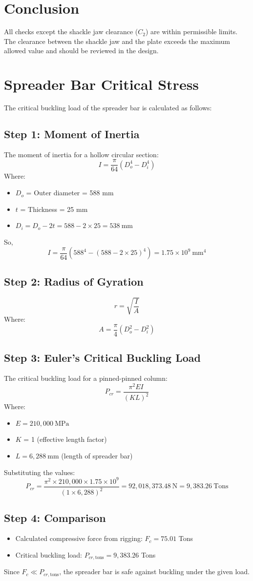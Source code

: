 \documentclass[12pt]{article}
\begin{document}
\section{Conclusion}
All checks except the shackle jaw clearance ($C_2$) are within permissible limits. The clearance between the shackle jaw and the plate exceeds the maximum allowed value and should be reviewed in the design.

\section{Spreader Bar Critical Stress}
The critical buckling load of the spreader bar is calculated as follows:

\subsection*{Step 1: Moment of Inertia}
The moment of inertia for a hollow circular section:
\[
I = \frac{\pi}{64} (D_o^4 - D_i^4)
\]
Where:
\begin{itemize}
  \item $D_o$ = Outer diameter = 588 mm
  \item $t$ = Thickness = 25 mm
  \item $D_i = D_o - 2t = 588 - 2 \times 25 = 538\ \mathrm{mm}$
\end{itemize}
So,
\[
I = \frac{\pi}{64} (588^4 - (588-2 \times 25)^4) = 1.75 \times 10^9\ \mathrm{mm}^4
\]

\subsection*{Step 2: Radius of Gyration}
\[
r = \sqrt{\frac{I}{A}}
\]
Where:
\[
A = \frac{\pi}{4} (D_o^2 - D_i^2)
\]

\subsection*{Step 3: Euler's Critical Buckling Load}
The critical buckling load for a pinned-pinned column:
\[
P_{cr} = \frac{\pi^2 E I}{(K L)^2}
\]
Where:
\begin{itemize}
  \item $E = 210,000\ \mathrm{MPa}$
  \item $K$ = 1 (effective length factor)
  \item $L = 6,288\ \mathrm{mm}$ (length of spreader bar)
\end{itemize}
Substituting the values:
\[
P_{cr} = \frac{\pi^2 \times 210,000 \times 1.75 \times 10^9}{(1 \times 6,288)^2} = 92,018,373.48\ \mathrm{N} = 9,383.26\ \text{Tons}
\]

\subsection*{Step 4: Comparison}
\begin{itemize}
  \item Calculated compressive force from rigging: $F_c = 75.01$ Tons
  \item Critical buckling load: $P_{cr,\text{tons}} = 9,383.26$ Tons
\end{itemize}
Since $F_c \ll P_{cr,\text{tons}}$, the spreader bar is safe against buckling under the given load.
\end{document}
